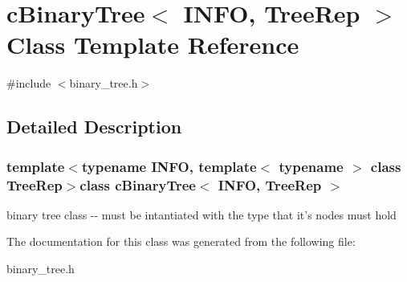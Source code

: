\hypertarget{classcBinaryTree}{
\section{c\-Binary\-Tree$<$ \-I\-N\-F\-O, \-Tree\-Rep $>$ \-Class \-Template \-Reference}
\label{classcBinaryTree}
}


{\ttfamily \#include $<$binary\-\_\-tree.\-h$>$}



\subsection{\-Detailed \-Description}
\subsubsection*{template$<$typename I\-N\-F\-O, template$<$ typename $>$ class \-Tree\-Rep$>$class c\-Binary\-Tree$<$ I\-N\-F\-O, Tree\-Rep $>$}

binary tree class -\/-\/ must be intantiated with the type that it's nodes must hold 

\-The documentation for this class was generated from the following file\-:\begin{DoxyCompactItemize}
\item 
binary\-\_\-tree.\-h\end{DoxyCompactItemize}
